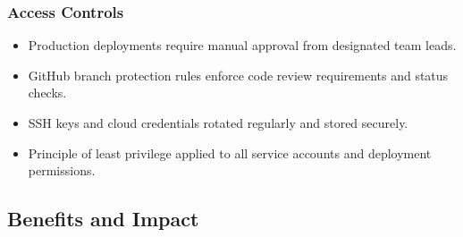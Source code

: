 \documentclass[12pt,a4paper]{article}
\begin{document}
\subsubsection{Access Controls}

\begin{itemize}[leftmargin=2em, itemsep=6pt]
    \item Production deployments require manual approval from designated team leads.
    \item GitHub branch protection rules enforce code review requirements and status checks.
    \item SSH keys and cloud credentials rotated regularly and stored securely.
    \item Principle of least privilege applied to all service accounts and deployment permissions.
\end{itemize}

\subsection{Benefits and Impact}
\end{document}
